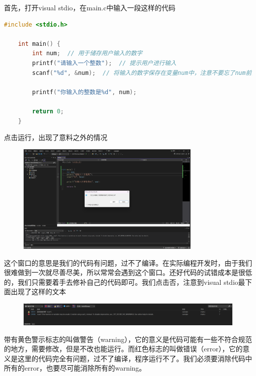 首先，打开visual stdio，在main.c中输入一段这样的代码

\begin{lstlisting}[language=C]
    #include <stdio.h>

    int main() {
        int num;  // 用于储存用户输入的数字
        printf("请输入一个整数");  // 提示用户进行输入
        scanf("%d", &num);  // 将输入的数字保存在变量num中，注意不要忘了num前的&

        printf("你输入的整数是%d", num);

        return 0;
    }
\end{lstlisting}

点击运行，出现了意料之外的情况

\begin{figure}[H]
    \centering
    \includegraphics[width=0.8\textwidth, height=0.4\textheight]{images/1标准输入报错.png}
\end{figure}

这个窗口的意思是我们的代码有问题，过不了编译。在实际编程开发时，由于我们很难做到一次就尽善尽美，所以常常会遇到这个窗口。还好代码的试错成本是很低的，我们只需要着手去修补自己的代码即可。我们点击否，注意到visual stdio最下面出现了这样的文本

\begin{figure}[H]
    \centering
    \includegraphics[width=\textwidth, height=0.2\textheight]{images/1ide错误提示.png}
\end{figure}

带有黄色警示标志的叫做警告（warning），它的意义是代码可能有一些不符合规范的地方，需要修改，但是不改也能运行。而红色标志的叫做错误（error），它的意义是这里的代码完全有问题，过不了编译，程序运行不了。我们必须要消除代码中所有的error，也要尽可能消除所有的warning。


